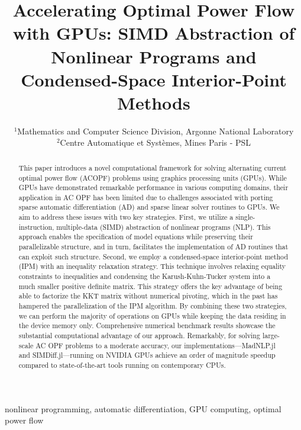 
\title{Accelerating Optimal Power Flow with GPUs: SIMD Abstraction of Nonlinear Programs and Condensed-Space Interior-Point Methods
}


\date{\small
  $^{1}$Mathematics and Computer Science Division, Argonne National Laboratory\\
  $^{2}$Centre Automatique et Syst\`{e}mes, Mines Paris - PSL
}

\maketitle
\begin{abstract}
  This paper introduces a novel computational framework for solving
alternating current optimal power flow (ACOPF) problems using
graphics processing units (GPUs). While GPUs have demonstrated
remarkable performance in various computing domains, their application
in AC OPF has been limited due to challenges associated with porting
sparse automatic differentiation (AD) and sparse linear solver
routines to GPUs. We aim to address these issues with two key
strategies. First, we utilize a single-instruction, multiple-data
(SIMD) abstraction of nonlinear programs (NLP). This approach enables
the specification of model equations while preserving their
parallelizable structure, and in turn, facilitates the implementation
of AD routines that can exploit such structure. Second, we employ a
condensed-space interior-point method (IPM) with an inequality
relaxation strategy. This technique involves relaxing equality
constraints to inequalities and condensing the Karush-Kuhn-Tucker
system into a much smaller positive definite matrix. This strategy
offers the key advantage of being able to factorize the KKT matrix
without numerical pivoting, which in the past has hampered the parallelization of
the IPM algorithm. By combining these two strategies, we can perform the
majority of operations on GPUs while keeping the data residing in the
device memory only. Comprehensive numerical benchmark results showcase
the substantial computational advantage of our approach. Remarkably,
for solving large-scale AC OPF problems to a moderate accuracy, our
implementations—MadNLP.jl and SIMDiff.jl—running on NVIDIA GPUs
achieve an order of magnitude speedup compared to state-of-the-art
tools running on contemporary CPUs.
\end{abstract}

\begin{IEEEkeywords}
  nonlinear programming, automatic differentiation, GPU computing, optimal power flow
\end{IEEEkeywords}
